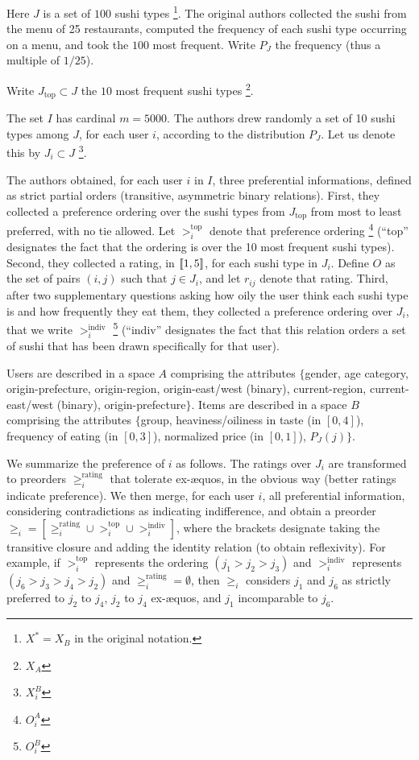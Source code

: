 \documentclass[french, english]{da2pl2018}
\begin{document}
Here $J$ is a set of $100$ sushi types \footnote{$X^*=X_B$ in the original notation.}. The original authors collected the sushi from the menu of 25 restaurants, computed the frequency of each sushi type occurring on a menu, and took the $100$ most frequent. Write $P_J$ the frequency (thus a multiple of $1/25$).

Write $J_\text{top} \subset J$ the $10$ most frequent sushi types \footnote{$X_A$}.

The set $I$ has cardinal $m = 5000$. The authors drew randomly a set of 10 sushi types among $J$, for each user $i$, according to the distribution $P_J$. Let us denote this by $J_i \subset J$ \footnote{$X^B_i$}.

The authors obtained, for each user $i$ in $I$, three preferential informations, defined as strict partial orders (transitive, asymmetric binary relations). First, they collected a preference ordering over the sushi types from $J_\text{top}$ from most to least preferred, with no tie allowed. Let $>^\text{top}_i$ denote that preference ordering \footnote{$O^A_i$} (“top” designates the fact that the ordering is over the 10 most frequent sushi types). Second, they collected a rating, in $\lbrack\!\lbrack{}1, 5\rbrack\!\rbrack$, for each sushi type in $J_i$. Define $O$ as the set of pairs $(i, j)$ such that $j \in J_i$, and let $r_{ij}$ denote that rating. Third, after two supplementary questions asking how oily the user think each sushi type is and how frequently they eat them, they collected a preference ordering over $J_i$, that we write $>^\text{indiv}_i$ \footnote{$O^B_i$} (“indiv” designates the fact that this relation orders a set of sushi that has been drawn specifically for that user).

Users are described in a space $A$ comprising the attributes $\{$gender, age category, origin-prefecture, origin-region, origin-east/west (binary), current-region, current-east/west (binary), origin-prefecture$\}$. Items are described in a space $B$ comprising the attributes $\{$group, heaviness/oiliness in taste (in $[0, 4]$), frequency of eating (in $[0, 3]$), normalized price (in $[0, 1]$), $P_J(j)$$\}$.

We summarize the preference of $i$ as follows. The ratings over $J_i$ are transformed to preorders $≥^\text{rating}_i$ that tolerate ex-æquos, in the obvious way (better ratings indicate preference). We then merge, for each user $i$, all preferential information, considering contradictions as indicating indifference, and obtain a preorder $≥_i = [≥^\text{rating}_i ∪ >^\text{top}_i ∪ >^\text{indiv}_i]$, where the brackets designate taking the transitive closure and adding the identity relation (to obtain reflexivity). For example, if $>^\text{top}_i$ represents the ordering $(j_1 > j_2 > j_3)$ and $>^\text{indiv}_i$ represents $(j_6 > j_3 > j_4 > j_2)$ and $≥^\text{rating}_i = \emptyset$, then $≥_i$ considers $j_1$ and $j_6$ as strictly preferred to $j_2$ to $j_4$, $j_2$ to $j_4$ ex-æquos, and $j_1$ incomparable to $j_6$.
\end{document}
